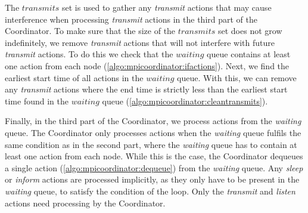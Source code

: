 The $\mathit{transmits}$ set is used to gather any \textit{transmit} actions that may cause interference when
processing \textit{transmit} actions in the third part of the Coordinator. To make sure that the size
of the $\mathit{transmits}$ set does not grow indefinitely, we remove \textit{transmit} actions that will not
interfere with future \textit{transmit} actions. To do this we check that the $\mathit{waiting}$ queue
contains at least one action from each node (\autoref{algo:mpicoordinator:ifactions}). Next, we find the
earliest start time of all actions in the $\mathit{waiting}$ queue. With this, we can remove any
\textit{transmit} actions where the end time is strictly less than the earliest start time found in the
$\mathit{waiting}$ queue (\autoref{algo:mpicoordinator:cleantransmits}). \medbreak

Finally, in the third part of the Coordinator, we process actions from the \textit{waiting} queue. The
Coordinator only processes actions when the \textit{waiting} queue fulfils the same condition as in the second
part, where the \textit{waiting} queue has to contain at least one action from each node. While this is the
case, the Coordinator dequeues a single action (\autoref{algo:mpicoordinator:dequeue}) from the
\textit{waiting} queue. Any \textit{sleep} or \textit{inform} actions are processed implicitly, as they only
have to be present in the \textit{waiting} queue, to satisfy the condition of the loop. Only the
\textit{transmit} and \textit{listen} actions need processing by the Coordinator. \medbreak 


